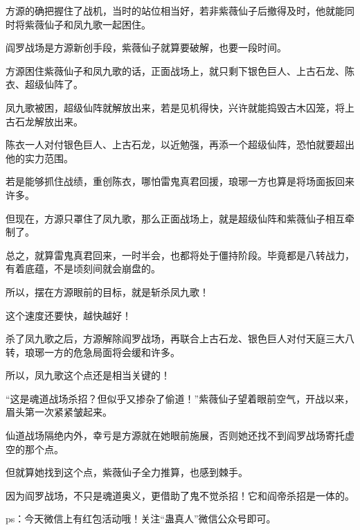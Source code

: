 \begin{this_body}
方源的确把握住了战机，当时的站位相当好，若非紫薇仙子后撤得及时，他就能同时将紫薇仙子和凤九歌一起困住。

阎罗战场是方源新创手段，紫薇仙子就算要破解，也要一段时间。

方源困住紫薇仙子和凤九歌的话，正面战场上，就只剩下银色巨人、上古石龙、陈衣、超级仙阵了。

凤九歌被困，超级仙阵就解放出来，若是见机得快，兴许就能捣毁古木囚笼，将上古石龙解放出来。

陈衣一人对付银色巨人、上古石龙，以近勉强，再添一个超级仙阵，恐怕就要超出他的实力范围。

若是能够抓住战绩，重创陈衣，哪怕雷鬼真君回援，琅琊一方也算是将场面扳回来许多。

但现在，方源只罩住了凤九歌，那么正面战场上，就是超级仙阵和紫薇仙子相互牵制了。

总之，就算雷鬼真君回来，一时半会，也都将处于僵持阶段。毕竟都是八转战力，有着底蕴，不是顷刻间就会崩盘的。

所以，摆在方源眼前的目标，就是斩杀凤九歌！

这个速度还要快，越快越好！

杀了凤九歌之后，方源解除阎罗战场，再联合上古石龙、银色巨人对付天庭三大八转，琅琊一方的危急局面将会缓和许多。

所以，凤九歌这个点还是相当关键的！

“这是魂道战场杀招？但似乎又掺杂了偷道！”紫薇仙子望着眼前空气，开战以来，眉头第一次紧紧皱起来。

仙道战场隔绝内外，幸亏是方源就在她眼前施展，否则她还找不到阎罗战场寄托虚空的那个点。

但就算她找到这个点，紫薇仙子全力推算，也感到棘手。

因为阎罗战场，不只是魂道奥义，更借助了鬼不觉杀招！它和阎帝杀招是一体的。

ps：今天微信上有红包活动哦！关注“蛊真人”微信公众号即可。

\end{this_body}

